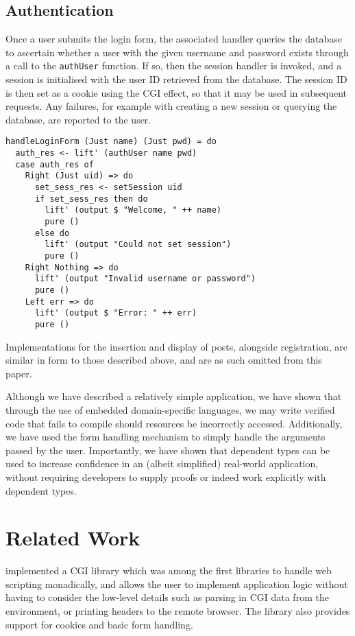 \documentclass[preprint]{sigplanconf}
\begin{document}
\subsection{Authentication}
Once a user submits the login form, the associated handler queries the database to ascertain whether a user with the given username and password exists through a call to the \texttt{authUser} function. If so, then the session handler is invoked, and a session is initialised with the user ID retrieved from the database. The session ID is then set as a cookie using the CGI effect, so that it may be used in subsequent requests. Any failures, for example with creating a new session or querying the database, are reported to the user.
\begin{Verbatim}
handleLoginForm (Just name) (Just pwd) = do
  auth_res <- lift' (authUser name pwd)
  case auth_res of
    Right (Just uid) => do
      set_sess_res <- setSession uid
      if set_sess_res then do
        lift' (output $ "Welcome, " ++ name)
        pure ()
      else do
        lift' (output "Could not set session")
        pure ()
    Right Nothing => do
      lift' (output "Invalid username or password")
      pure ()
    Left err => do
      lift' (output $ "Error: " ++ err)
      pure ()
\end{Verbatim}
Implementations for the insertion and display of posts, alongside registration, are similar in form to those described above, and are as such omitted from this paper.

Although we have described a relatively simple application, we have shown that through the use of embedded domain-specific languages, we may write verified code that fails to compile should resources be incorrectly accessed. Additionally, we have used the form handling mechanism to simply handle the arguments passed by the user. Importantly, we have shown that dependent types can be used to increase confidence in an (albeit simplified) real-world application, without requiring developers to supply proofs or indeed work explicitly with dependent types. 

\section{Related Work}
\citet{meijer:cgi} implemented a CGI library which was among the first
libraries to handle web scripting monadically, and allows the user to implement
application logic without having to consider the low-level details such as
parsing in CGI data from the environment, or printing headers to the remote
browser. The library also provides support for cookies and basic form handling. 
\end{document}
